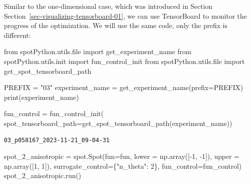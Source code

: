 \documentclass[
  letterpaper,
  DIV=11,
  numbers=noendperiod]{scrreprt}
\newenvironment{Shaded}{\begin{snugshade}}{\end{snugshade}}
\newcommand{\BuiltInTok}[1]{\textcolor[rgb]{0.00,0.23,0.31}{#1}}
\newcommand{\DecValTok}[1]{\textcolor[rgb]{0.68,0.00,0.00}{#1}}
\newcommand{\ImportTok}[1]{\textcolor[rgb]{0.00,0.46,0.62}{#1}}
\newcommand{\NormalTok}[1]{\textcolor[rgb]{0.00,0.23,0.31}{#1}}
\newcommand{\OperatorTok}[1]{\textcolor[rgb]{0.37,0.37,0.37}{#1}}
\newcommand{\StringTok}[1]{\textcolor[rgb]{0.13,0.47,0.30}{#1}}
\begin{document}
\begin{tcolorbox}[enhanced jigsaw, rightrule=.15mm, opacityback=0, colframe=quarto-callout-note-color-frame, opacitybacktitle=0.6, toptitle=1mm, arc=.35mm, colbacktitle=quarto-callout-note-color!10!white, coltitle=black, toprule=.15mm, leftrule=.75mm, titlerule=0mm, title=\textcolor{quarto-callout-note-color}{\faInfo}\hspace{0.5em}{TensorBoard}, bottomrule=.15mm, breakable, bottomtitle=1mm, left=2mm, colback=white]

Similar to the one-dimensional case, which was introduced in Section
Section~\ref{sec-visualizing-tensorboard-01}, we can use TensorBoard to
monitor the progress of the optimization. We will use the same code,
only the prefix is different:

\begin{Shaded}
\begin{Highlighting}[]
\ImportTok{from}\NormalTok{ spotPython.utils.}\BuiltInTok{file} \ImportTok{import}\NormalTok{ get\_experiment\_name}
\ImportTok{from}\NormalTok{ spotPython.utils.init }\ImportTok{import}\NormalTok{ fun\_control\_init}
\ImportTok{from}\NormalTok{ spotPython.utils.}\BuiltInTok{file} \ImportTok{import}\NormalTok{ get\_spot\_tensorboard\_path}

\NormalTok{PREFIX }\OperatorTok{=} \StringTok{"03"}
\NormalTok{experiment\_name }\OperatorTok{=}\NormalTok{ get\_experiment\_name(prefix}\OperatorTok{=}\NormalTok{PREFIX)}
\BuiltInTok{print}\NormalTok{(experiment\_name)}

\NormalTok{fun\_control }\OperatorTok{=}\NormalTok{ fun\_control\_init(}
\NormalTok{    spot\_tensorboard\_path}\OperatorTok{=}\NormalTok{get\_spot\_tensorboard\_path(experiment\_name))}
\end{Highlighting}
\end{Shaded}

\begin{verbatim}
03_p058167_2023-11-21_09-04-31
\end{verbatim}

\end{tcolorbox}

\begin{Shaded}
\begin{Highlighting}[]
\NormalTok{spot\_2\_anisotropic }\OperatorTok{=}\NormalTok{ spot.Spot(fun}\OperatorTok{=}\NormalTok{fun,}
\NormalTok{                   lower }\OperatorTok{=}\NormalTok{ np.array([}\OperatorTok{{-}}\DecValTok{1}\NormalTok{, }\OperatorTok{{-}}\DecValTok{1}\NormalTok{]),}
\NormalTok{                   upper }\OperatorTok{=}\NormalTok{ np.array([}\DecValTok{1}\NormalTok{, }\DecValTok{1}\NormalTok{]),}
\NormalTok{                   surrogate\_control}\OperatorTok{=}\NormalTok{\{}\StringTok{"n\_theta"}\NormalTok{: }\DecValTok{2}\NormalTok{\},}
\NormalTok{                   fun\_control}\OperatorTok{=}\NormalTok{fun\_control)}
\NormalTok{spot\_2\_anisotropic.run()}
\end{Highlighting}
\end{Shaded}
\end{document}
